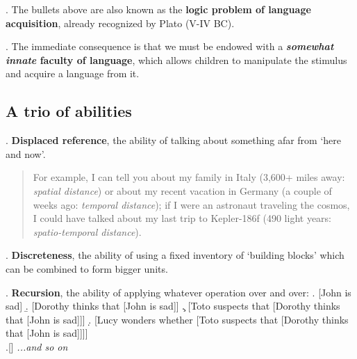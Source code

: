 \documentclass[11pt, oneside]{article}   	%
\begin{document}
\ex. The bullets above are also known as the {\bfseries logic problem of language acquisition}, already recognized by Plato (V-IV BC). 

\ex. The immediate consequence is that we must be endowed with a {\bfseries {\itshape somewhat innate} faculty of language}, which allows children to manipulate the stimulus and acquire a language from it.

\subsection{A trio of abilities}

\ex. {\bfseries Displaced reference}, the ability of talking about something afar from `here and now'. 

\begin{quote}
For example, I can tell you about my family in Italy (3,600+ miles away: {\itshape spatial distance}) or about my recent vacation in Germany (a couple of weeks ago: {\itshape temporal distance}); if I were an astronaut traveling the cosmos, I could have talked about my last trip to Kepler-186f (490 light years: {\itshape spatio-temporal distance}).
\end{quote}

\ex. {\bfseries Discreteness}, the ability of using a fixed inventory of `building blocks' which can be combined to form bigger units. 

\begin{center}
\end{center}

\ex. {\bfseries Recursion}, the ability of applying whatever operation over and over: 
\a. {[John is sad]}
\b. {[Dorothy thinks that [John is sad]]}
\c. {[Toto suspects that [Dorothy thinks that [John is sad]]]}
\d. {[Lucy wonders whether [Toto suspects that [Dorothy thinks that [John is sad]]]]} \\
\e.[] \hfill {\itshape ...and so on}
\end{document}
